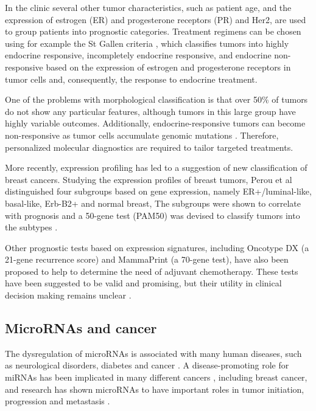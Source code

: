 In the clinic several other tumor characteristics, such as patient age, and the
expression of estrogen (ER) and progesterone receptors (PR) and Her2, are used
to group patients into prognostic categories. Treatment regimens can be chosen
using for example the St Gallen criteria \citep{Goldhirsch2007}, which
classifies tumors into highly endocrine responsive, incompletely endocrine
responsive, and endocrine non-responsive based on the expression of estrogen
and progesterone receptors in tumor cells and, consequently, the response
to endocrine treatment.

One of the problems with morphological classification is that over 50\% of
tumors do not show any particular features, although tumors in this large
group have highly variable outcomes. Additionally, endocrine-responsive tumors
can become non-responsive as tumor cells accumulate genomic mutations \citep{Oesterreich2013}.
Therefore, personalized molecular diagnostics are required to tailor targeted treatments.

More recently, expression profiling has led to a suggestion of new
classification of breast cancers. Studying the expression profiles of breast
tumors, Perou et al \citep{Perou2000} distinguished four subgroups based on
gene expression, namely ER+/luminal-like, basal-like, Erb-B2+ and normal
breast, The subgroups were shown to correlate with prognosis and a 50-gene
test (PAM50) was devised to classify tumors into the subtypes
\citep{Parker2009}.

Other prognostic tests based on expression signatures, including Oncotype DX
(a 21-gene recurrence score) and MammaPrint (a 70-gene test), have also been
proposed to help to determine the need of adjuvant chemotherapy. These tests
have been suggested to be valid and promising, but their utility in clinical
decision making remains unclear \citep{Azim2013}.




\subsection{MicroRNAs and cancer}

The dysregulation of microRNAs is associated with many human diseases, such as
neurological disorders, diabetes and cancer \citep{Jiang2009}. A
disease-promoting role for miRNAs has been implicated in many different
cancers \citep{Melo2011}, including breast cancer, and research has shown microRNAs
to have important roles in tumor initiation,
progression and metastasis \citep{Lin2015}.

